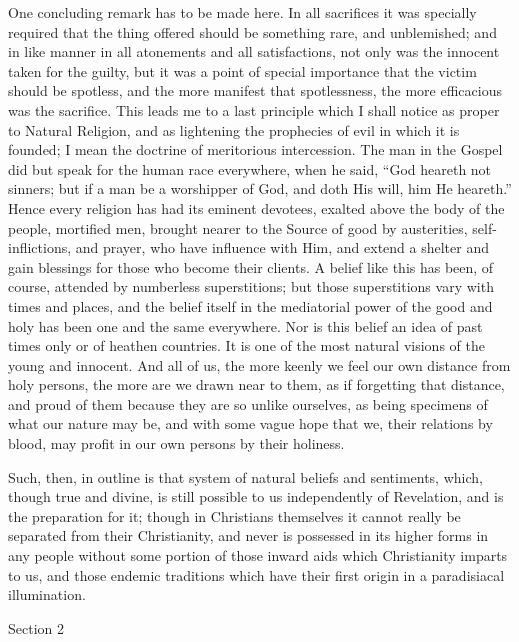 One concluding remark has to be made here. In all sacrifices it was
specially required that the thing offered should be something rare,
and unblemished; and in like manner in all atonements and all
satisfactions, not only was the innocent taken for the guilty, but it
was a point of special importance that the victim should be spotless,
and the more manifest that spotlessness, the more efficacious was the
sacrifice. This leads me to a last principle which I shall notice as
proper to Natural Religion, and as lightening the prophecies of evil
in which it is founded; I mean the doctrine of meritorious
intercession. The man in the Gospel did but speak for the human race
everywhere, when he said, ``God heareth not sinners; but if a man
be a worshipper of God, and doth His will, him He heareth.'' Hence
every religion has had its eminent devotees, exalted above the
body of the people, mortified men, brought nearer to the Source of
good by austerities, self-inflictions, and prayer, who have influence
with Him, and extend a shelter and gain blessings for those who become
their clients. A belief like this has been, of course, attended by
numberless superstitions; but those superstitions vary with times and
places, and the belief itself in the mediatorial power of the good and
holy has been one and the same everywhere. Nor is this belief an idea
of past times only or of heathen countries. It is one of the most
natural visions of the young and innocent. And all of us, the more
keenly we feel our own distance from holy persons, the more are we
drawn near to them, as if forgetting that distance, and proud of them
because they are so unlike ourselves, as being specimens of what our
nature may be, and with some vague hope that we, their relations by
blood, may profit in our own persons by their holiness.

Such, then, in outline is that system of natural beliefs and
sentiments, which, though true and divine, is still possible to us
independently of Revelation, and is the preparation for it; though in
Christians themselves it cannot really be separated from their
Christianity, and never is possessed in its higher forms in any people
without some portion of those inward aids which Christianity imparts
to us, and those endemic traditions which have their first origin in a
paradisiacal illumination.

Section 2


